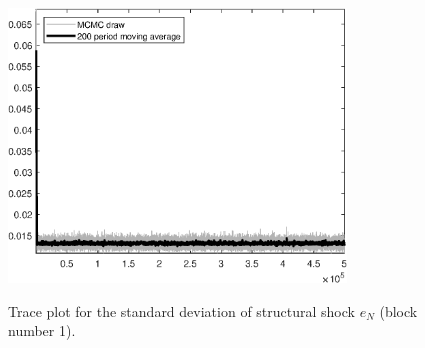 \begin{figure}[H]
\centering
  \includegraphics[width=0.8\textwidth]{BRS_growth_ext_shopping/graphs/TracePlot_SE_e_N_blck_1}\\
    \caption{Trace plot for the standard deviation of structural shock ${e_N}$ (block number 1).}
\end{figure}

